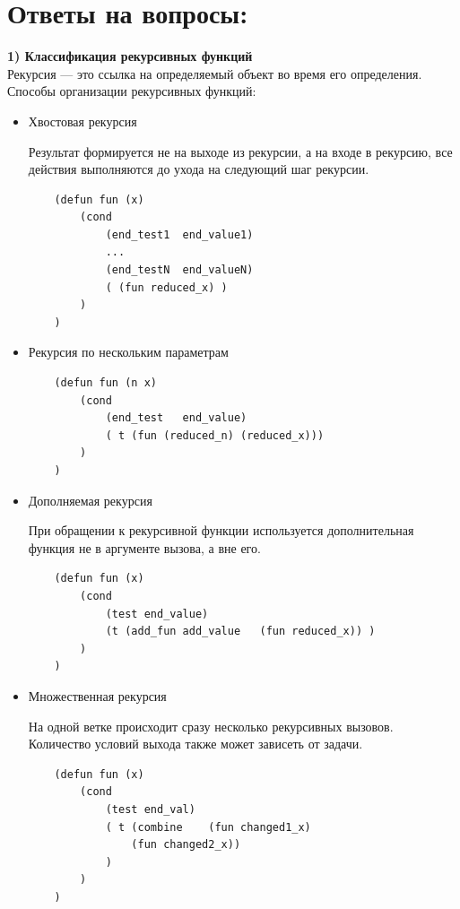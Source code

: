 \documentclass[a4paper, 12pt]{article}
\begin{document}
\section*{Ответы на вопросы:}
\hspace*{-7mm} \textbf{1) Классификация рекурсивных функций}
\\Рекурсия — это ссылка на определяемый объект во время его определения.
Способы организации рекурсивных функций:
\begin{itemize}
	\item Хвостовая рекурсия
	
	Результат формируется не на выходе из рекурсии, а на входе в рекурсию, все действия выполняются до ухода на следующий шаг рекурсии.
	\begin{lstlisting}
	(defun fun (x)
		(cond	
			(end_test1	end_value1)
			...
			(end_testN	end_valueN)
			( (fun reduced_x) )
		) 
	)
	\end{lstlisting}
	\item Рекурсия по нескольким параметрам
	\begin{lstlisting}
	(defun fun (n x)
		(cond	
			(end_test	end_value)
			( t	(fun (reduced_n) (reduced_x))) 
		)
	)
	\end{lstlisting}
	\item Дополняемая рекурсия
	
	При обращении к рекурсивной функции используется дополнительная функция не в аргументе вызова, а вне его.
	\begin{lstlisting}
	(defun fun (x)
		(cond	
			(test end_value)
			(t (add_fun	add_value	(fun reduced_x)) )
		)
	)
	\end{lstlisting}
	
	\item Множественная рекурсия
	
	На одной ветке происходит сразу несколько рекурсивных вызовов. Количество условий выхода также может зависеть от задачи.
	\begin{lstlisting}
	(defun fun (x)
		(cond	
			(test end_val)
			( t (combine	(fun changed1_x)
				(fun changed2_x))
			)
		)
	)
	\end{lstlisting}
\end{itemize}
\end{document}
